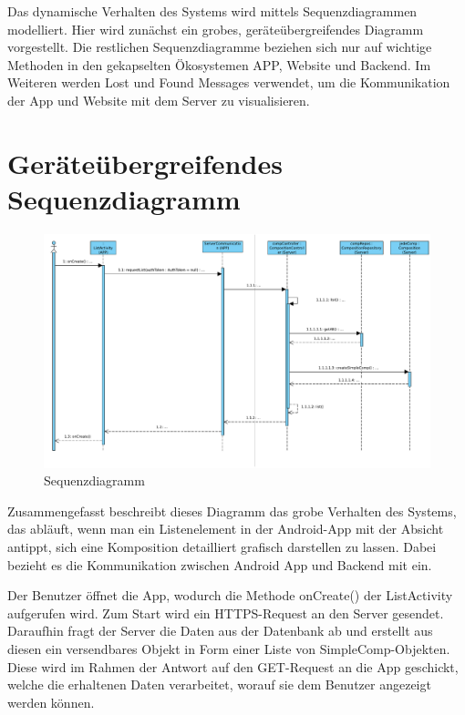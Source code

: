 	Das dynamische Verhalten des Systems wird mittels Sequenzdiagrammen modelliert.
	Hier wird zunächst ein grobes, geräteübergreifendes Diagramm vorgestellt.
	Die restlichen Sequenzdiagramme beziehen sich nur auf wichtige Methoden in den gekapselten Ökosystemen APP, Website und Backend. Im Weiteren werden Lost und Found Messages verwendet, um die Kommunikation der App und Website mit dem Server zu visualisieren. 
	
\section*{Geräteübergreifendes Sequenzdiagramm}

\begin{figure}[h]
	\centering
	\includegraphics[width=\textwidth]{img/Diagramme/Sequenz/Overview}
	\caption{Sequenzdiagramm}
	\label{fig:sequenz-overview}
\end{figure}
\noindent
Zusammengefasst beschreibt dieses Diagramm das grobe Verhalten des Systems, das abläuft, wenn man ein Listenelement in der Android-App mit der Absicht antippt, sich eine Komposition detailliert grafisch darstellen zu lassen. Dabei bezieht es die Kommunikation zwischen Android App und Backend mit ein.\newline

\noindent Der Benutzer öffnet die App, wodurch die Methode onCreate() der ListActivity aufgerufen wird. Zum Start wird ein HTTPS-Request an den Server gesendet. Daraufhin fragt der Server die Daten aus der Datenbank ab und erstellt aus diesen ein versendbares Objekt in Form einer Liste von SimpleComp-Objekten. Diese wird im Rahmen der Antwort auf den GET-Request an die App geschickt, welche die erhaltenen Daten verarbeitet, worauf sie dem Benutzer angezeigt werden können.

